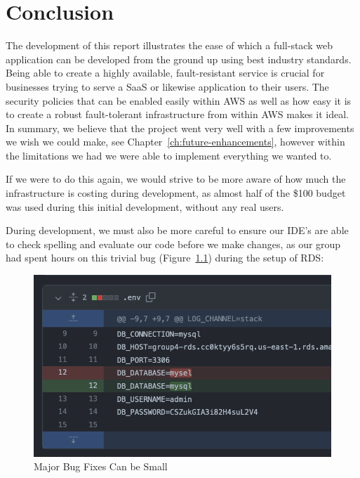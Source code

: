 \chapter{Conclusion}

The development of this report illustrates the ease of which a full-stack web application can be developed from the ground up using best industry standards. Being able to create a highly available, fault-resistant service is crucial for businesses trying to serve a SaaS or likewise application to their users. The security policies that can be enabled easily within AWS as well as how easy it is to create a robust fault-tolerant infrastructure from within AWS makes it ideal.
In summary, we believe that the project went very well with a few improvements we wish we could make, see Chapter~\ref{ch:future-enhancements}, however within the limitations we had we were able to implement everything we wanted to.

If we were to do this again, we would strive to be more aware of how much the infrastructure is costing during development, as almost half of the \$100 budget was used during this initial development, without any real users.

During development, we must also be more careful to ensure our IDE's are able to check spelling and evaluate our code before we make changes, as our group had spent hours on this trivial bug (Figure~\ref{fig:bug-fudge}) during the setup of RDS:
\begin{figure}[!htbp]
    \centering
    \includegraphics[width=\textwidth]{resources/rds/mysql.png}
    \caption{Major Bug Fixes Can be Small}
    \label{fig:bug-fudge}
\end{figure}